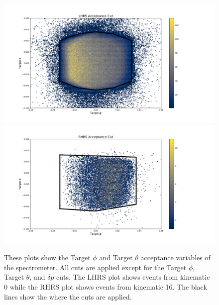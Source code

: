 \begin{figure}
\begin{center}
	\includegraphics[width=\textwidth]{./analysis/fig/LHRS_ACC.pdf}
	\includegraphics[width=\textwidth]{./analysis/fig/RHRS_ACC.pdf}
	\caption{These plots show the Target $\phi$ and Target $\theta$ acceptance variables of the spectrometer. All cuts are applied except for the Target $\phi$, Target $\theta$, and $\delta p$ cuts. The LHRS plot shows events from kinematic 0 while the RHRS plot shows events from kinematic 16. The black lines show the where the cuts are applied.}
	\label{fig:acc}
\end{center}
\end{figure}

